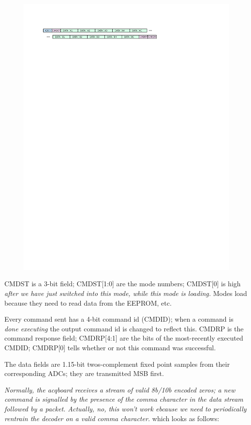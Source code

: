 \begin{figure}[h!]
\includegraphics[width=6in]{txpacket.svg}
\end{figure}

CMDST is a 3-bit field; CMDST[1:0] are the mode numbers; CMDST[0] is high \textit{after we have just switched into this mode, while this mode is loading.} Modes load because they need to read data from the EEPROM, etc. 

Every command sent has a 4-bit command id (CMDID); when a command is \textit{done executing} the output command id is changed to reflect this. CMDRP is the command response field; CMDRP[4:1] are the bits of the most-recently executed CMDID; CMDRP[0] tells whether or not this command was successful. 

The data fields are 1.15-bit twos-complement fixed point samples from their corresponding ADCs; they are transmitted MSB first. 

\emph{Normally, the acqboard receives a stream of valid 8b/10b encoded zeros; a new command is signalled by the presence of the comma character in the data stream followed by a packet. Actually, no, this won't work ebcause we need to periodically rentrain the decoder on a valid comma character. } which looks as follows:

